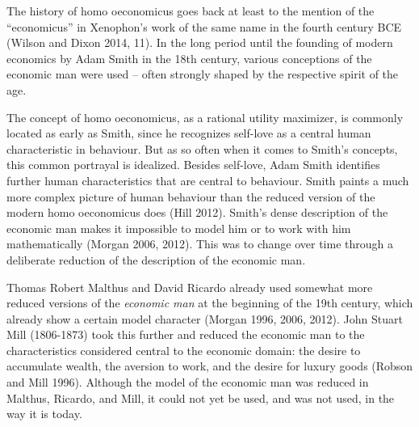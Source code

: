 \documentclass[
  british,
  a4paper,
  DIV=11,
  numbers=noendperiod,
  oneside,
  openany]{scrreprt}
\begin{document}
\begin{tcolorbox}[enhanced jigsaw, arc=.35mm, bottomrule=.15mm, bottomtitle=1mm, breakable, colback=white, colbacktitle=quarto-callout-tip-color!10!white, colframe=quarto-callout-tip-color-frame, coltitle=black, left=2mm, leftrule=.75mm, opacityback=0, opacitybacktitle=0.6, rightrule=.15mm, title={Excursus: History of homo oeconomicus}, titlerule=0mm, toprule=.15mm, toptitle=1mm]

The history of homo oeconomicus goes back at least to the mention of the
``economicus'' in Xenophon's work of the same name in the fourth century
BCE (Wilson and Dixon 2014, 11). In the long period until the founding
of modern economics by Adam Smith in the 18th century, various
conceptions of the economic man\footnotemark{} were used -- often
strongly shaped by the respective spirit of the age.

The concept of homo oeconomicus, as a rational utility maximizer, is
commonly located as early as Smith, since he recognizes self-love as a
central human characteristic in behaviour. But as so often when it comes
to Smith's concepts, this common portrayal is idealized. Besides
self-love, Adam Smith identifies further human characteristics that are
central to behaviour. Smith paints a much more complex picture of human
behaviour than the reduced version of the modern homo oeconomicus does
(Hill 2012). Smith's dense description of the economic man makes it
impossible to model him or to work with him mathematically (Morgan 2006,
2012). This was to change over time through a deliberate reduction of
the description of the economic man.

Thomas Robert Malthus and David Ricardo already used somewhat more
reduced versions of the \emph{economic man} at the beginning of the 19th
century, which already show a certain model character (Morgan 1996,
2006, 2012). John Stuart Mill (1806-1873) took this further and reduced
the economic man to the characteristics considered central to the
economic domain: the desire to accumulate wealth, the aversion to work,
and the desire for luxury goods (Robson and Mill 1996). Although the
model of the economic man was reduced in Malthus, Ricardo, and Mill, it
could not yet be used, and was not used, in the way it is today.


\end{tcolorbox}
\end{document}
